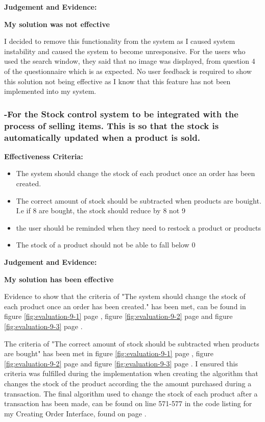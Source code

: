 \textbf{Judgement and Evidence:} \newline

\textbf{\large{My solution was not effective}}

I decided to remove this functionality from the system as I caused system instability and caused the system to become unresponsive. For the users who used the search window, they said that no image was displayed, from question 4 of the questionnaire which is as expected. No user feedback is required to show this solution not being effective as I know that this feature has not been implemented into my system.




\pagebreak
\subsubsection{-For the Stock control system to be integrated with the process of selling items. This is so that the stock is automatically updated when a product is sold.}
\label{stock-change-effectiveness}

\textbf{Effectiveness Criteria:}\newline
\begin{itemize}
	\item{The system should change the stock of each product once an order has been created.}
	\item{The correct amount of stock should be subtracted when products are bouight. I.e if 8 are bought, the stock should reduce by 8 not 9}
	\item {the user should be reminded when they need to restock a product or products}
	\item{The stock of a product should not be able to fall below 0}
\end{itemize}

\textbf{Judgement and Evidence:} \newline

\textbf{\large{My solution has been effective}}

Evidence to show that the criteria of "The system should change the stock of each product once an order has been created." has been met, can be found in figure \ref{fig:evaluation-9-1} page \pageref{fig:evaluation-9-1}, figure \ref{fig:evaluation-9-2} page \pageref{fig:evaluation-9-2} and figure \ref{fig:evaluation-9-3} page \pageref{fig:evaluation-9-3}. 

The criteria of "The correct amount of stock should be subtracted when products are bought" has been met in figure \ref{fig:evaluation-9-1} page \pageref{fig:evaluation-9-1}, figure \ref{fig:evaluation-9-2} page \pageref{fig:evaluation-9-2} and figure \ref{fig:evaluation-9-3} page \pageref{fig:evaluation-9-3}.  I ensured this criteria was fulfilled during the implementation when creating the algorithm that changes the stock of the product according the the amount purchased during a transaction. The final algorithm used to change the stock of each product after a transaction has been made, can be found on line 571-577 in the code listing for my Creating Order Interface, found on page \pageref{order}.

